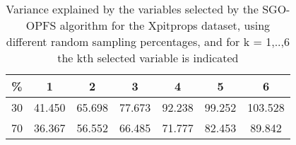 \begin{table}
	\begin{center}
		\begin{tabular}{c c c c c c c}
			\% & 1 & 2 & 3 & 4 & 5 & 6 \\
			\hline
			30 & 41.450 & 65.698 & 77.673 & 92.238 & 99.252 & 103.528 \\
			70 & 36.367 & 56.552 & 66.485 & 71.777 & 82.453 & 89.842 \\
		\end{tabular}
	\end{center}
	\caption{Variance explained by the variables selected by the SGO-OPFS algorithm for the Xpitprops dataset, using different random sampling percentages, and for k = 1,..,6 the kth selected variable is indicated}
\end{table}